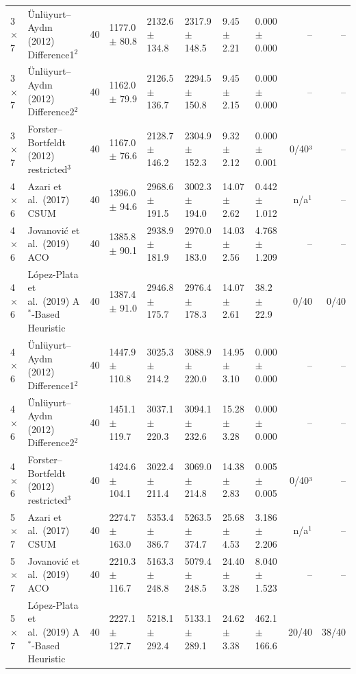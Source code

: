 \begin{table}[htbp]
\begin{tabular}{llrlllllrr}
3$\times$7 & \"{U}nl\"{u}yurt--Ayd\i{}n (2012) Difference1$^{2}$ & 40 & 1177.0 $\pm$ 80.8 & 2132.6 $\pm$ 134.8 & 2317.9 $\pm$ 148.5 & 9.45 $\pm$ 2.21 & 0.000 $\pm$ 0.000 & -- & -- \\
3$\times$7 & \"{U}nl\"{u}yurt--Ayd\i{}n (2012) Difference2$^{2}$ & 40 & 1162.0 $\pm$ 79.9 & 2126.5 $\pm$ 136.7 & 2294.5 $\pm$ 150.8 & 9.45 $\pm$ 2.15 & 0.000 $\pm$ 0.000 & -- & -- \\
3$\times$7 & Forster--Bortfeldt (2012) restricted$^{3}$ & 40 & 1167.0 $\pm$ 76.6 & 2128.7 $\pm$ 146.2 & 2304.9 $\pm$ 152.3 & 9.32 $\pm$ 2.12 & 0.000 $\pm$ 0.001 & 0/40³ & -- \\
\midrule
4$\times$6 & Azari et al.\ (2017) CSUM & 40 & 1396.0 $\pm$ 94.6 & 2968.6 $\pm$ 191.5 & 3002.3 $\pm$ 194.0 & 14.07 $\pm$ 2.62 & 0.442 $\pm$ 1.012 & n/a$^{1}$ & -- \\
4$\times$6 & Jovanovi\'{c} et al.\ (2019) ACO & 40 & 1385.8 $\pm$ 90.1 & 2938.9 $\pm$ 181.9 & 2970.0 $\pm$ 183.0 & 14.03 $\pm$ 2.56 & 4.768 $\pm$ 1.209 & -- & -- \\
4$\times$6 & L\'{o}pez-Plata et al.\ (2019) A$^\ast$-Based Heuristic & 40 & 1387.4 $\pm$ 91.0 & 2946.8 $\pm$ 175.7 & 2976.4 $\pm$ 178.3 & 14.07 $\pm$ 2.61 & 38.2 $\pm$ 22.9 & 0/40 & 0/40 \\
4$\times$6 & \"{U}nl\"{u}yurt--Ayd\i{}n (2012) Difference1$^{2}$ & 40 & 1447.9 $\pm$ 110.8 & 3025.3 $\pm$ 214.2 & 3088.9 $\pm$ 220.0 & 14.95 $\pm$ 3.10 & 0.000 $\pm$ 0.000 & -- & -- \\
4$\times$6 & \"{U}nl\"{u}yurt--Ayd\i{}n (2012) Difference2$^{2}$ & 40 & 1451.1 $\pm$ 119.7 & 3037.1 $\pm$ 220.3 & 3094.1 $\pm$ 232.6 & 15.28 $\pm$ 3.28 & 0.000 $\pm$ 0.000 & -- & -- \\
4$\times$6 & Forster--Bortfeldt (2012) restricted$^{3}$ & 40 & 1424.6 $\pm$ 104.1 & 3022.4 $\pm$ 211.4 & 3069.0 $\pm$ 214.8 & 14.38 $\pm$ 2.83 & 0.005 $\pm$ 0.005 & 0/40³ & -- \\
\midrule
5$\times$7 & Azari et al.\ (2017) CSUM & 40 & 2274.7 $\pm$ 163.0 & 5353.4 $\pm$ 386.7 & 5263.5 $\pm$ 374.7 & 25.68 $\pm$ 4.53 & 3.186 $\pm$ 2.206 & n/a$^{1}$ & -- \\
5$\times$7 & Jovanovi\'{c} et al.\ (2019) ACO & 40 & 2210.3 $\pm$ 116.7 & 5163.3 $\pm$ 248.8 & 5079.4 $\pm$ 248.5 & 24.40 $\pm$ 3.28 & 8.040 $\pm$ 1.523 & -- & -- \\
5$\times$7 & L\'{o}pez-Plata et al.\ (2019) A$^\ast$-Based Heuristic & 40 & 2227.1 $\pm$ 127.7 & 5218.1 $\pm$ 292.4 & 5133.1 $\pm$ 289.1 & 24.62 $\pm$ 3.38 & 462.1 $\pm$ 166.6 & 20/40 & 38/40 \\

\end{tabular}
\end{table}
